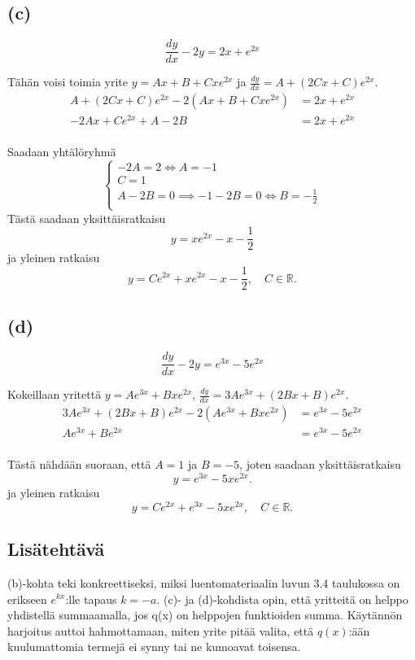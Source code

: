 \documentclass{article}
\begin{document}
\subsection*{(c)}

\[
  \frac{dy}{dx} - 2y = 2x + e^{2x}
\]

Tähän voisi toimia yrite $y = Ax + B + Cxe^{2x}$ ja
$\frac{dy}{dx} = A + (2Cx + C)e^{2x}$.
\begin{align*}
  A + (2Cx + C)e^{2x} - 2(Ax + B + Cxe^{2x}) &= 2x + e^{2x} \\
  -2Ax + Ce^{2x} + A - 2B &= 2x + e^{2x} \\
\end{align*}

Saadaan yhtälöryhmä
\[
  \begin{cases}
    -2A = 2 \iff A = -1 \\
    C = 1 \\
    A - 2B = 0 \implies -1 - 2B = 0 \iff B = -\frac{1}{2} \\
  \end{cases}
\]
Tästä saadaan yksittäisratkaisu
\[
  y = xe^{2x} - x - \frac{1}{2}
\]
ja yleinen ratkaisu
\[
  y = Ce^{2x} + xe^{2x} - x - \frac{1}{2}, \quad C \in \mathbb{R}.
\]

\subsection*{(d)}

\[
  \frac{dy}{dx} - 2y = e^{3x} - 5e^{2x}
\]

Kokeillaan yritettä $y = Ae^{3x} + Bxe^{2x}$,
$\frac{dy}{dx} = 3Ae^{3x} + (2Bx + B)e^{2x}$.
\begin{align*}
  3Ae^{3x} + (2Bx + B)e^{2x} - 2(Ae^{3x} + Bxe^{2x}) &= e^{3x} - 5e^{2x} \\
  Ae^{3x} + Be^{2x} &= e^{3x} - 5e^{2x} \\
\end{align*}

Tästä nähdään suoraan, että $A = 1$ ja $B = -5$, joten saadaan yksittäisratkaisu
\[
  y = e^{3x} - 5xe^{2x}.
\]
ja yleinen ratkaisu
\[
  y = Ce^{2x} + e^{3x} - 5xe^{2x}, \quad C \in \mathbb{R}.
\]

\subsection*{Lisätehtävä}

(b)-kohta teki konkreettiseksi, miksi luentomateriaalin luvun 3.4 taulukossa on
erikseen $e^{kx}$:lle tapaus $k = -a$. (c)- ja (d)-kohdista opin, että
yritteitä on helppo yhdistellä summaamalla, jos q(x) on helppojen funktioiden
summa.  Käytännön harjoitus auttoi hahmottamaan, miten yrite pitää valita, että
$q(x)$:ään kuulumattomia termejä ei synny tai ne kumoavat toisensa.
\end{document}
